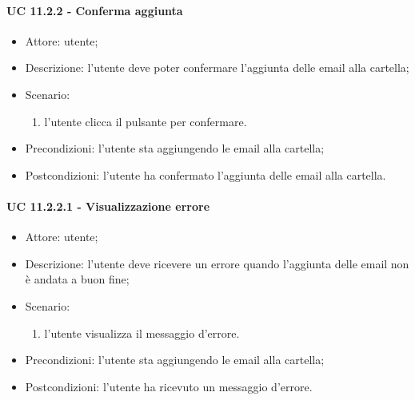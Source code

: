     \paragraph{UC 11.2.2 - Conferma aggiunta} \label{sec: UC 11.2.2}
    \begin{itemize}
        \item Attore: utente;
        \item Descrizione: l'utente deve poter confermare l'aggiunta delle email alla cartella;
        \item Scenario:
        \begin{enumerate}
        \item l'utente clicca il pulsante per confermare.
        \end{enumerate}
        \item Precondizioni: l'utente sta aggiungendo le email alla cartella;
        \item Postcondizioni: l'utente ha confermato l'aggiunta delle email alla cartella.
    \end{itemize}
    \paragraph{UC 11.2.2.1 - Visualizzazione errore} \label{sec: UC 11.2.2.1}
    \begin{itemize}
        \item Attore: utente;
        \item Descrizione: l'utente deve ricevere un errore quando l'aggiunta delle email non è andata a buon fine;
        \item Scenario:
        \begin{enumerate}
        \item l'utente visualizza il messaggio d'errore.
        \end{enumerate}   
        \item Precondizioni: l'utente sta aggiungendo le email alla cartella;
        \item Postcondizioni: l'utente ha ricevuto un messaggio d'errore.
    \end{itemize}
